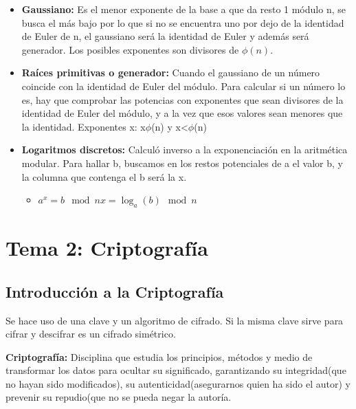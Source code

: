 \documentclass[12pt, twoside, openright]{report} %
\begin{document}
\begin{itemize}
  \item \textbf{Gaussiano:} Es el menor exponente de la base a que da resto
    1 módulo n, se busca el más bajo por lo que si no se encuentra uno
    por dejo de la identidad de Euler de n, el gaussiano será la
    identidad de Euler y además será generador. Los posibles exponentes
    son divisores de $\phi(n)$.
    
  \item \textbf{Raíces primitivas o generador:} Cuando el gaussiano de un
    número coincide con la identidad de Euler del módulo. Para calcular
    si un número lo es, hay que comprobar las potencias con exponentes
    que sean divisores de la identidad de Euler del módulo, y a la vez
    que esos valores sean menores que la identidad. Exponentes x:
    x\textbar $\phi$(n) y x\textless $\phi$(n)
    
  \item \textbf{Logaritmos discretos:} Calculó inverso a la exponenciación
    en la aritmética modular. Para hallar b, buscamos en los restos
    potenciales de a el valor b, y la columna que contenga el b será la
    x.
    

    \begin{itemize}
    \item
      
	  $a^x = b \mod n x=\log_a(b) \mod n$
      
    \end{itemize}
  \end{itemize}

  
\chapter{Tema 2: Criptografía}
\section{Introducción a la Criptografía}

  Se hace uso de una clave y un algoritmo de cifrado. Si la misma clave
  sirve para cifrar y descifrar es un cifrado simétrico.
  
  \textbf{Criptografía:} Disciplina que estudia los principios, métodos
  y medio de transformar los datos para ocultar su significado,
  garantizando su integridad(que no hayan sido modificados), su
  autenticidad(asegurarnos quien ha sido el autor) y prevenir su
  repudio(que no se pueda negar la autoría.
  
\end{document}
